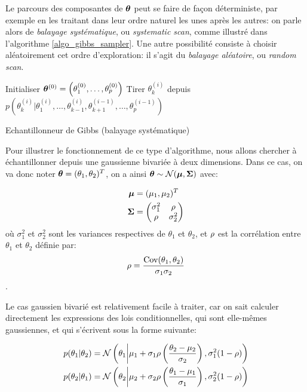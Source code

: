 Le parcours des composantes de ${\bm{\theta}}$ peut se faire de façon déterministe, par exemple en les traitant dans leur ordre naturel les unes après les autres: on parle alors de \textit{balayage systématique}, ou \textit{systematic scan}, comme illustré dans l'algorithme \ref{algo_gibbs_sampler}. Une autre possibilité consiste à choisir aléatoirement cet ordre d'exploration: il s'agit du \textit{balayage aléatoire}, ou \textit{random scan}. \\


\begin{algorithm}
	\begin{algorithmic}
	\State Initialiser ${\bm{\theta}}^{(0)} = \left(\theta_1^{(0)}, \dots, \theta_p^{(0)}\right)$
			\State Tirer $\theta_k^{(i)}$ depuis $p(\theta_k^{(i)} | \theta_1^{(i)}, \dots, \theta_{k-1}^{(i)}, \theta_{k+1}^{(i-1)}, \dots, \theta_p^{(i-1)})$
			\EndFor
		\EndFor
	\end{algorithmic}
	\caption{Echantillonneur de Gibbs (balayage systématique)}
	\label{algo_gibbs_sampler}
\end{algorithm}

Pour illustrer le fonctionnement de ce type d'algorithme, nous allons chercher à échantillonner depuis une gaussienne bivariée à deux dimensions. Dans ce cas, on va donc noter ${\bm{\theta}} = (\theta_1, \theta_2)^T$, on a ainsi ${\bm{\theta}} \sim \mathcal{N}({\bm{\mu}}, {\bm{\Sigma}})$ avec: 

\begin{equation}
{
\label{eq_caracs_gaussienne_bivariee}
\begin{split}
{\bm{\mu}}&= (\mu_1, \mu_2)^T \\
{\bm{\Sigma}}&= \begin{pmatrix}
\sigma_{1}^2 & {\rho}\\
 {\rho}& \sigma_{2}^2 
\end{pmatrix}
\end{split}
}
\end{equation} 
où $\sigma_1^2$ et $\sigma_2^2$ sont les variances respectives de $\theta_1$ et $\theta_2$, et {${\rho}$} est la corrélation entre $\theta_1$ et $\theta_2$ définie par: {$${\rho} = \dfrac{\text{Cov}(\theta_1,\theta_2)}{\sigma_1\sigma_2}$$.}

Le cas gaussien bivarié est relativement facile à traiter, car on sait calculer directement les expressions des lois conditionnelles, qui sont elle-mêmes gaussiennes, et qui s'écrivent sous la forme suivante:

 \begin{equation}
 {
 \label{eq_conditionnelles_gaussienne_bivariee}
 \begin{split}
 p(\theta_1 | \theta_2) &= \mathcal{N}\left(\theta_1 \middle\vert \mu_1 + \sigma_1 {\rho}\left(\dfrac{\theta_2 - \mu_2}{\sigma_2}\right), \sigma_1^2 (1-{\rho})\right) \\
 p(\theta_2 | \theta_1) &= \mathcal{N}\left(\theta_2 \middle\vert \mu_2 + \sigma_2 {\rho}\left(\dfrac{\theta_1 - \mu_1}{\sigma_1}\right), \sigma_2^2 (1-{\rho})\right)
 \end{split}
}
 \end{equation}
 
